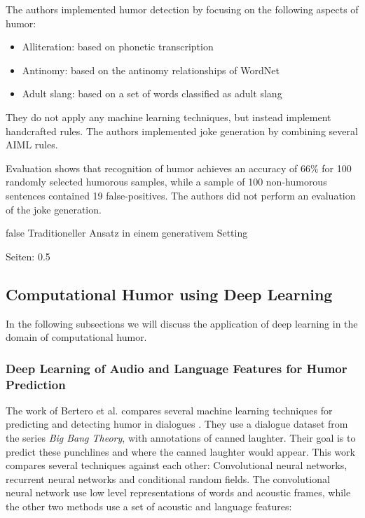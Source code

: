\documentclass[draft,final,oneside]{vutinfth} %
\begin{document}
The authors implemented humor detection by focusing on the following aspects of humor: 

\begin{itemize}
\item Alliteration: based on phonetic transcription
\item Antinomy: based on the antinomy relationships of WordNet 
\item Adult slang: based on a set of words classified as adult slang
\end{itemize}

They do not apply any machine learning techniques, but instead implement handcrafted rules. The authors implemented joke generation by combining several AIML rules.

Evaluation shows that recognition of humor achieves an accuracy of 66\% for 100 randomly selected humorous samples, while a sample of 100 non-humorous sentences contained 19 false-positives. The authors did not perform an evaluation of the joke generation.


\if false
Traditioneller Ansatz in einem generativem Setting

\cite{HumoristBot}

Seiten: 0.5
\fi
\pagebreak
\subsection{Computational Humor using Deep Learning}

In the following subsections we will discuss the application of deep learning in the domain of computational humor. 

\subsubsection{Deep Learning of Audio and Language Features for Humor Prediction}

The work of Bertero et al. compares several machine learning techniques for predicting and detecting humor in dialogues \cite{Bertero2016DeepLO}. They use a dialogue dataset from the series \textit{Big Bang Theory}, with annotations of canned laughter. Their goal is to predict these punchlines and where the canned laughter would appear. This work compares several techniques against each other: Convolutional neural networks, recurrent neural networks and conditional random fields. The convolutional neural network use low level representations of words and acoustic frames, while the other two methods use a set of acoustic and language features:
\end{document}
